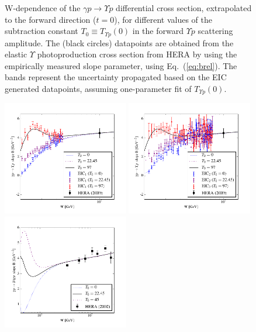 \documentclass[10pt,prd,aps,nofootinbib,superscriptaddress]{revtex4}
\begin{document}
\begin{figure}
\caption{W-dependence of the $\gamma p \to \Upsilon p$ differential cross section, extrapolated to the forward direction ($t=0$), 
for different values of the subtraction constant $T_0 \equiv T_{\Upsilon p} (0)$ in the forward $\Upsilon p$ scattering amplitude.
The (black circles) datapoints are obtained from the elastic $\Upsilon$ photoproduction cross section from HERA by using the empirically 
measured slope parameter, using Eq.~(\ref{eq:brel}).
The bands represent the uncertainty propagated based on the EIC generated datapoints,
assuming one-parameter fit of $T_{\Upsilon p}(0)$.}
\label{fig:dsigmadt0}
\end{figure}


\begin{figure}
\includegraphics[width=0.49\textwidth]{b_slope_eic1.pdf}
\includegraphics[width=0.49\textwidth]{b_slope_eic2.pdf}
\includegraphics[width=0.49\textwidth]{b_slope_jpsi.pdf}

\end{figure}
\end{document}
